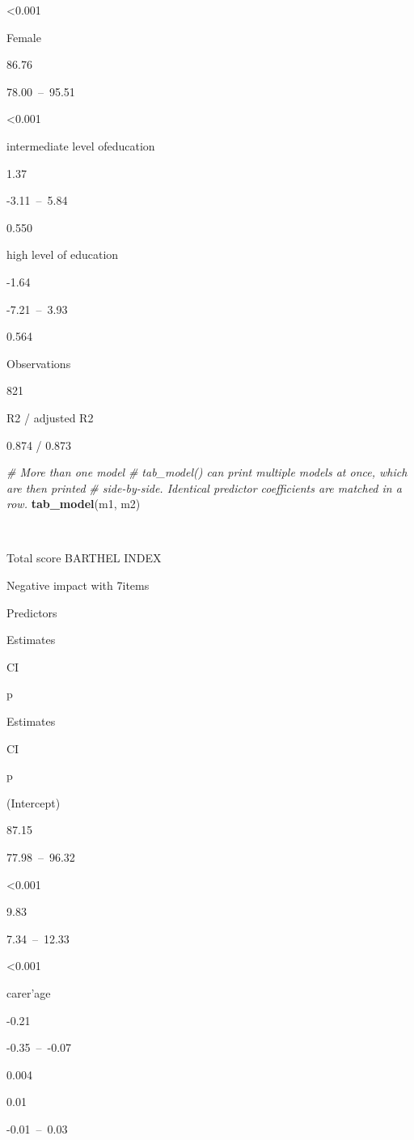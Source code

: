 \documentclass[]{article}
\newenvironment{Shaded}{\begin{snugshade}}{\end{snugshade}}
\newcommand{\KeywordTok}[1]{\textcolor[rgb]{0.13,0.29,0.53}{\textbf{#1}}}
\newcommand{\CommentTok}[1]{\textcolor[rgb]{0.56,0.35,0.01}{\textit{#1}}}
\newcommand{\NormalTok}[1]{#1}
\begin{document}
\textless{}0.001

Female

86.76

78.00~--~95.51

\textless{}0.001

intermediate level ofeducation

1.37

-3.11~--~5.84

0.550

high level of education

-1.64

-7.21~--~3.93

0.564

Observations

821

R2 / adjusted R2

0.874 / 0.873

\begin{Shaded}
\begin{Highlighting}[]
\CommentTok{# More than one model}
\CommentTok{# tab_model() can print multiple models at once, which are then printed }
\CommentTok{# side-by-side. Identical predictor coefficients are matched in a row.}
\KeywordTok{tab_model}\NormalTok{(m1, m2)}
\end{Highlighting}
\end{Shaded}

~

Total score BARTHEL INDEX

Negative impact with 7items

Predictors

Estimates

CI

p

Estimates

CI

p

(Intercept)

87.15

77.98~--~96.32

\textless{}0.001

9.83

7.34~--~12.33

\textless{}0.001

carer'age

-0.21

-0.35~--~-0.07

0.004

0.01

-0.01~--~0.03
\end{document}
